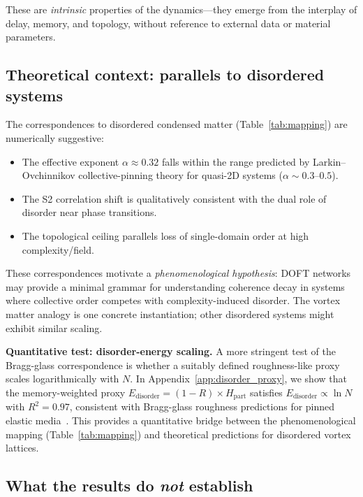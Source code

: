 \documentclass[reprint,aps,prb,superscriptaddress,floatfix]{revtex4-2}
\begin{document}
These are \emph{intrinsic} properties of the dynamics---they emerge from the interplay of delay, memory, and topology, without reference to external data or material parameters.

\subsection{Theoretical context: parallels to disordered systems}

The correspondences to disordered condensed matter (Table~\ref{tab:mapping}) are numerically suggestive:

\begin{itemize}
\item The effective exponent $\alpha \approx 0.32$ falls within the range predicted by Larkin--Ovchinnikov collective-pinning theory for quasi-2D systems ($\alpha \sim 0.3$--$0.5$).
\item The S2 correlation shift is qualitatively consistent with the dual role of disorder near phase transitions.
\item The topological ceiling parallels loss of single-domain order at high complexity/field.
\end{itemize}

These correspondences motivate a \emph{phenomenological hypothesis}: DOFT networks may provide a minimal grammar for understanding coherence decay in systems where collective order competes with complexity-induced disorder. The vortex matter analogy is one concrete instantiation; other disordered systems might exhibit similar scaling.

\textbf{Quantitative test: disorder-energy scaling.} A more stringent test of the Bragg-glass correspondence is whether a suitably defined roughness-like proxy scales logarithmically with $N$. In Appendix~\ref{app:disorder_proxy}, we show that the memory-weighted proxy $E_{\mathrm{disorder}} = (1-R) \times H_{\mathrm{part}}$ satisfies $E_{\mathrm{disorder}} \propto \ln N$ with $R^2 = 0.97$, consistent with Bragg-glass roughness predictions for pinned elastic media~\cite{GiamarchiLeDoussal1994,Giamarchi1995}. This provides a quantitative bridge between the phenomenological mapping (Table~\ref{tab:mapping}) and theoretical predictions for disordered vortex lattices.

\subsection{What the results do \emph{not} establish}
\end{document}

